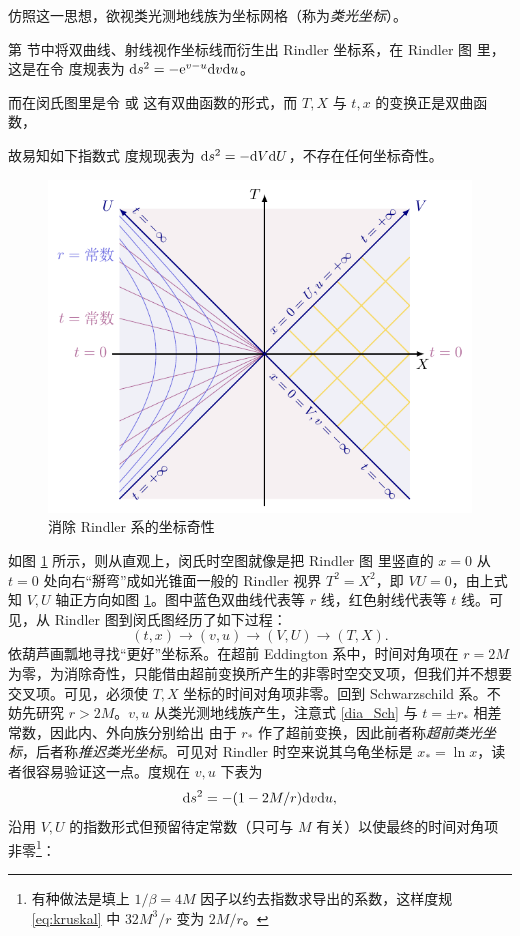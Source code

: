 仿照这一思想，欲视类光测地线族为坐标网格（称为\textit{类光坐标}）。

第  节中将双曲线、射线视作坐标线而衍生出 Rindler 坐标系，在 Rindler 图  里，这是在令
度规表为 $\dd s^2=-\mathrm{e}^{v-u}\dd v\dd u$。

而在闵氏图里是令
或
这有双曲函数的形式，而 $T,X$ 与 $t,x$ 的变换正是双曲函数，

故易知如下指数式
度规现表为 $\dd s^2=-\dd V\dd U$，不存在任何坐标奇性。

\begin{figure}[h!]
    \centering
    \includegraphics[width=.6\textwidth]{fig/chpt02/rindler.pdf}
    \caption{消除 Rindler 系的坐标奇性}
    \label{fig:rindlerIM}
\end{figure}
如图 \ref{fig:rindlerIM} 所示，则从直观上，闵氏时空图就像是把 Rindler 图 里竖直的 $x=0$ 从 $t=0$ 处向右“掰弯”成如光锥面一般的 Rindler 视界 $T^2=X^2$，即 $VU=0$，由上式知 $V,U$ 轴正方向如图 \ref{fig:rindlerIM}。图中蓝色双曲线代表等 $r$ 线，红色射线代表等 $t$ 线。可见，从 Rindler 图到闵氏图经历了如下过程：
\[
(t,x)\to(v,u)\to(V,U)\to(T,X).
\]
依葫芦画瓢地寻找“更好”坐标系。在超前 Eddington 系中，时间对角项在 $r=2M$ 为零，为消除奇性，只能借由超前变换所产生的非零时空交叉项，但我们并不想要交叉项。可见，必须使 $T,X$ 坐标的时间对角项非零。回到 Schwarzschild 系。不妨先研究 $r>2M$。$v,u$ 从类光测地线族产生，注意式 \eqref{dia_Sch} 与 $t=\pm r_*$ 相差常数，因此内、外向族分别给出
由于 $r_*$ 作了超前变换，因此前者称\textit{超前类光坐标}，后者称\textit{推迟类光坐标}。可见对 Rindler 时空来说其乌龟坐标是 $x_*=\ln x$，读者很容易验证这一点。度规在 $v,u$ 下表为
\[
\dd s^2=-(1-2M/r)\dd v\dd u,
\]
沿用 $V,U$ 的指数形式但预留待定常数（只可与 $M$ 有关）以使最终的时间对角项非零\footnote{有种做法是填上 $1/\beta=4M$ 因子以约去指数求导出的系数，这样度规 \eqref{eq:kruskal} 中 ${32M^3}/{r}$ 变为 $2M/r$。}：
